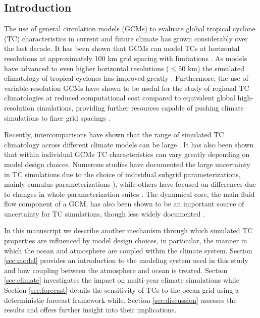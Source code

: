 \documentclass[draft,ms]{AGUTeX}
\begin{document}
\begin{article}

\section{Introduction}

The use of general circulation models (GCMs) to evaluate global tropical cyclone (TC) characteristics in current and future climate has grown considerably over the last decade.  It has been shown that GCMs can model TCs at horizontal resolutions at approximately 100 km grid spacing with limitations \citep[e.g.,][]{Bengtsson2007a,Knutson2010,Strachan2013}. As models have advanced to even higher horizontal resolutions ($\le 50$ km) the simulated climatology of tropical cyclones has improved greatly \citep[e.g.,][]{Oouchi2006,Zhao2009,Murakami2012,Manganello2012,Satoh2012,Bacmeister2014,Wehner2014,Reed2015}. Furthermore, the use of variable-resolution GCMs have shown to be useful for the study of regional TC climatologies at reduced computational cost compared to equivalent global high-resolution simulations, providing further resources capable of pushing climate simulations to finer grid spacings \citep{Zarzycki2014,Zarzycki2014AMIPTCs}.  

Recently, intercomparisons have shown that the range of simulated TC climatology across different climate models can be large \citep{Camargo2013CMIP,Walsh2015CLIVAR}.  It has also been shown that within individual GCMs TC characteristics can vary greatly depending on model design choices.  Numerous studies have documented the large uncertainty in TC simulations due to the choice of individual subgrid parameterizations, mainly cumulus parameterizations \citep[e.g.,][]{Kim2012,Reed2011CAMPhysics,Lim2014TCconv}), while others have focused on differences due to changes in whole parameterization suites \citep{Reed2011c,Bacmeister2014}. The dynamical core, the main fluid flow component of a GCM, has also been shown to be an important source of uncertainty for TC simulations, though less widely documented \citep{ReedSimplePhys,Zhao2012,Reed2015}.

In this manuscript we describe another mechanism through which simulated TC properties are influenced by model design choices, in particular, the manner in which the ocean and atmosphere are coupled within the climate system. Section \ref{sec:model} provides an introduction to the modeling system used in this study and how coupling between the atmosphere and ocean is treated. Section \ref{sec:climate} investigates the impact on multi-year climate simulations while Section \ref{sec:forecast} details the sensitivity of TCs to the ocean grid using a deterministic forecast framework while. Section \ref{sec:discussion} assesses the results and offers further insight into their implications.


\end{article}
\end{document}
